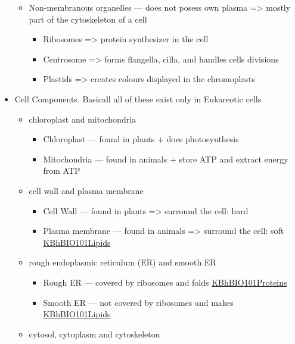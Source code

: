 \documentclass[letterpaper]{article}
\begin{document}
\begin{itemize}
\begin{itemize}
\item Non-membranous organelles --- does not posess own plasma => mostly
part of the cytoskeleton of a cell

\begin{itemize}
\item Ribosomes => protein synthesizer in the cell
\item Centrosome => forms flangella, cilla, and handles cells divisions
\item Plastids => creates colours displayed in the chromoplasts
\end{itemize}
\end{itemize}

\item Cell Components. Basicall all of these exist only in Eukareotic cells

\begin{itemize}
\item chloroplast and mitochondria

\begin{itemize}
\item Chloroplast --- found in plants + does photosynthesis
\item Mitochondria --- found in animals + store ATP and extract energy
from ATP
\end{itemize}

\item cell wall and plasma membrane

\begin{itemize}
\item Cell Wall --- found in plants => surround the cell: hard
\item Plasma membrane --- found in animals => surround the cell: soft
\href{KBhBIO101Lipids.org}{KBhBIO101Lipids}
\end{itemize}

\item rough endoplasmic reticulum (ER) and smooth ER

\begin{itemize}
\item Rough ER --- covered by ribosomes and folds
\href{KBhBIO101Proteins.org}{KBhBIO101Proteins}
\item Smooth ER --- not covered by ribosomes and makes
\href{KBhBIO101Lipids.org}{KBhBIO101Lipids}
\end{itemize}

\item cytosol, cytoplasm and cytoskeleton


\end{itemize}
\end{itemize}
\end{document}

